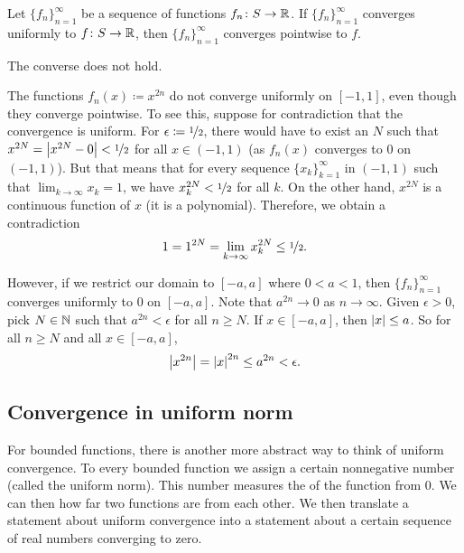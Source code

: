 \begin{prop}
Let $\{ f_n \}_{n=1}^\infty$ be a sequence of functions $f_n \colon S \to {\mathbb{R}}$.
If $\{ f_n \}_{n=1}^\infty$ converges
uniformly to $f \colon S \to {\mathbb{R}}$, then $\{ f_n \}_{n=1}^\infty$ converges pointwise to $f$.
\end{prop}

The converse does not hold.

\begin{example}
The functions $f_n(x) \coloneqq x^{2n}$ do not converge uniformly on $[-1,1]$,
even though they converge pointwise.  To see this, suppose for contradiction
that the convergence is uniform.  For $\epsilon \coloneqq \nicefrac{1}{2}$, there would have
to exist an $N$ such that $x^{2N} = \left\lvert {x^{2N} - 0} \right\rvert < \nicefrac{1}{2}$ for all $x \in
(-1,1)$ (as $f_n(x)$ converges to 0 on $(-1,1)$).  But that means that
for every sequence $\{ x_k \}_{k=1}^\infty$ in $(-1,1)$ such that $\lim_{k\to\infty} x_k = 1$,
we have $x_k^{2N} < \nicefrac{1}{2}$ for all $k$.  On the other hand,
$x^{2N}$ is a continuous function of $x$ (it is a polynomial).  Therefore,
we obtain a contradiction
\begin{equation*}
1 = 1^{2N}  = \lim_{k\to\infty} x_k^{2N} \leq \nicefrac{1}{2} .
\end{equation*}

However, if we restrict our domain to $[-a,a]$ where $0 < a < 1$, then
$\{ f_n \}_{n=1}^\infty$ converges uniformly to 0 on $[-a,a]$.  Note that
$a^{2n} \to 0$ as $n \to \infty$.  Given $\epsilon > 0$,
pick $N \in {\mathbb{N}}$ such that
$a^{2n} < \epsilon$ for all $n \geq N$.
If $x \in [-a,a]$, then
$\left\lvert {x} \right\rvert \leq a$.  So
for all $n \geq N$ and all $x \in [-a,a]$,
\begin{equation*}
\left\lvert {x^{2n}} \right\rvert = \left\lvert {x} \right\rvert^{2n} \leq a^{2n} < \epsilon .
\end{equation*}
\end{example}

\subsection{Convergence in uniform norm}

For bounded functions, there is another more abstract way to 
think of uniform convergence.  To every bounded function we assign
a certain nonnegative number (called the uniform norm).  This number
measures the  of the function from 0.  We can then
how far two functions are from each other.  We then translate
a statement about uniform convergence into a statement about a certain
sequence of real numbers converging to zero.

